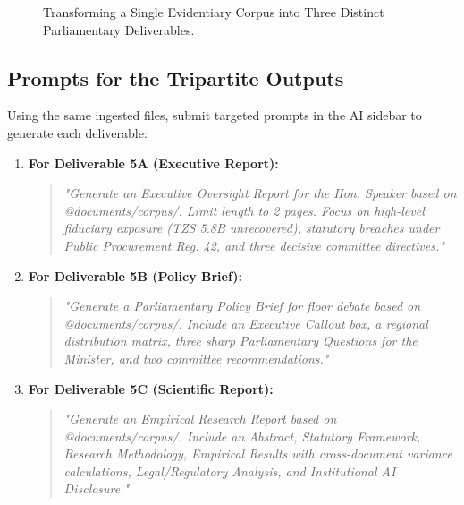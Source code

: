 \documentclass[11pt, a4paper]{report}
\begin{document}
\begin{figure}[htbp]
  \centering
  \caption{Transforming a Single Evidentiary Corpus into Three Distinct Parliamentary Deliverables.}
  \label{fig:tripartite_architecture}
\end{figure}

\subsection{Prompts for the Tripartite Outputs}
Using the same ingested files, submit targeted prompts in the AI sidebar to generate each deliverable:

\begin{enumerate}[label=\textbf{\arabic*.}]
    \item \textbf{For Deliverable 5A (Executive Report):}
    \begin{quote}
        \small\textit{"Generate an Executive Oversight Report for the Hon. Speaker based on @documents/corpus/. Limit length to 2 pages. Focus on high-level fiduciary exposure (TZS 5.8B unrecovered), statutory breaches under Public Procurement Reg. 42, and three decisive committee directives."}
    \end{quote}
    \item \textbf{For Deliverable 5B (Policy Brief):}
    \begin{quote}
        \small\textit{"Generate a Parliamentary Policy Brief for floor debate based on @documents/corpus/. Include an Executive Callout box, a regional distribution matrix, three sharp Parliamentary Questions for the Minister, and two committee recommendations."}
    \end{quote}
    \item \textbf{For Deliverable 5C (Scientific Report):}
    \begin{quote}
        \small\textit{"Generate an Empirical Research Report based on @documents/corpus/. Include an Abstract, Statutory Framework, Research Methodology, Empirical Results with cross-document variance calculations, Legal/Regulatory Analysis, and Institutional AI Disclosure."}
    \end{quote}
\end{enumerate}
\end{document}
